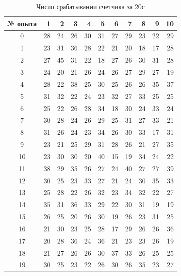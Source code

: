 \documentclass[a4paper, 12pt]{article}
\begin{document}
    \newpage
    \begin{table}[H]
    \begin{center}
    \begin{tabular}{|c|r|r|r|r|r|r|r|r|r|r|}
    \hline
    {№ опыта} &   1 &   2 &   3 &   4 &   5 &   6 &   7 &   8 &   9 &  10 \\
    \hline
    0 & 28 & 24 & 26 & 30 & 31 & 27 & 29 & 23 & 22 & 29 \\
    1 & 23 & 31 & 36 & 28 & 22 & 21 & 20 & 18 & 17 & 28 \\
    2 & 27 & 45 & 31 & 22 & 18 & 27 & 26 & 30 & 31 & 28 \\
    3 & 24 & 20 & 21 & 26 & 24 & 26 & 27 & 29 & 27 & 19 \\
    4 & 28 & 22 & 38 & 25 & 30 & 25 & 26 & 26 & 35 & 37 \\
    5 & 31 & 32 & 22 & 24 & 23 & 32 & 27 & 33 & 25 & 25 \\
    6 & 25 & 22 & 26 & 28 & 34 & 18 & 30 & 24 & 33 & 24 \\
    7 & 30 & 28 & 24 & 26 & 29 & 25 & 31 & 27 & 33 & 21 \\
    8 & 31 & 26 & 24 & 23 & 34 & 26 & 30 & 33 & 17 & 31 \\
    9 & 23 & 21 & 25 & 29 & 31 & 28 & 26 & 21 & 27 & 35 \\
    10 & 23 & 30 & 30 & 20 & 40 & 15 & 19 & 34 & 24 & 22 \\
    11 & 38 & 29 & 35 & 26 & 27 & 24 & 40 & 27 & 27 & 39 \\
    12 & 30 & 25 & 23 & 33 & 27 & 21 & 24 & 30 & 35 & 33 \\
    13 & 25 & 28 & 22 & 26 & 32 & 23 & 34 & 32 & 22 & 27 \\
    14 & 35 & 31 & 36 & 33 & 29 & 22 & 30 & 31 & 19 & 19 \\
    15 & 26 & 25 & 20 & 26 & 30 & 19 & 26 & 23 & 31 & 25 \\
    16 & 21 & 30 & 23 & 25 & 28 & 17 & 29 & 26 & 26 & 36 \\
    17 & 20 & 28 & 36 & 24 & 36 & 21 & 23 & 23 & 26 & 19 \\
    18 & 21 & 27 & 26 & 26 & 30 & 37 & 33 & 26 & 25 & 25 \\
    19 & 30 & 25 & 23 & 22 & 26 & 30 & 26 & 35 & 23 & 27 \\
    \hline
    \end{tabular}
    \caption{Число срабатывании счетчика за 20с}
    \end{center}
    \end{table}
\end{document}
